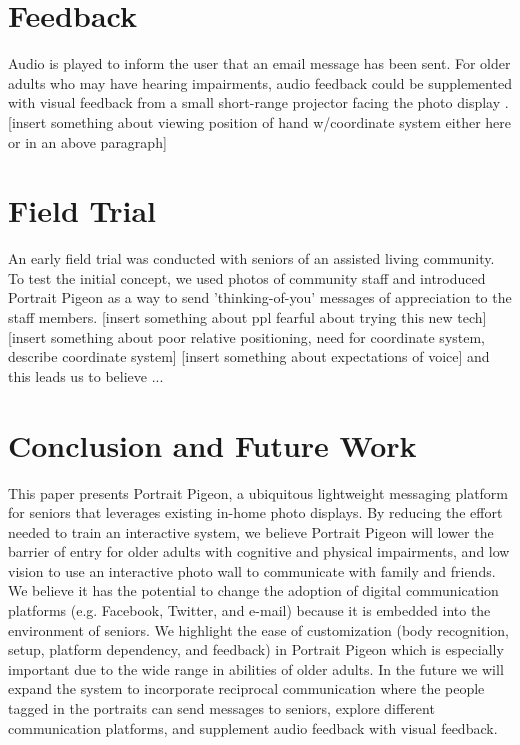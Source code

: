 \documentclass{chi-ext}
\begin{document}
\section{Feedback}
Audio is played to inform the user that an email message has been sent. For older adults who may have hearing impairments, audio feedback could be supplemented with visual feedback from a small short-range projector facing the photo display \cite{Wilson2010}. [insert something about viewing position of hand w/coordinate system either here or in an above paragraph]

\section{Field Trial}
An early field trial was conducted with seniors of an assisted living community. To test the initial concept, we used photos of community staff and introduced Portrait Pigeon as a way to send 'thinking-of-you' messages of appreciation to the staff members. [insert something about ppl fearful about trying this new tech] [insert something about poor relative positioning, need for coordinate system, describe coordinate system] [insert something about expectations of voice] and this leads us to believe ...

\section{Conclusion and Future Work}
This paper presents Portrait Pigeon, a ubiquitous lightweight messaging platform for seniors that leverages existing in-home photo displays. By reducing the effort needed to train an interactive system, we believe Portrait Pigeon will lower the barrier of entry for older adults with cognitive and physical impairments, and low vision to use an interactive photo wall to communicate with family and friends. We believe it has the potential to change the adoption of digital communication platforms (e.g. Facebook, Twitter, and e-mail) because it is embedded into the environment of seniors.  We highlight the ease of customization (body recognition, setup, platform dependency, and feedback) in Portrait Pigeon which is especially important due to the wide range in abilities of older adults. In the future we will expand the system to incorporate reciprocal communication where the people tagged in the portraits can send messages to seniors, explore different communication platforms, and supplement audio feedback with visual feedback.	

\balance


\end{document}
